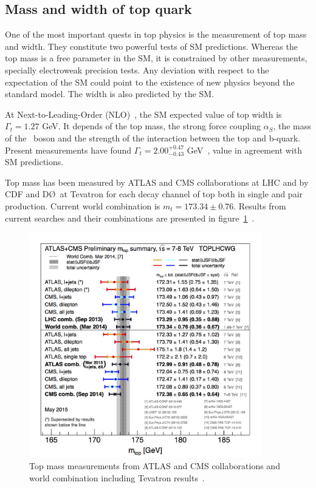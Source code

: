\subsection{Mass and width of top quark}

One of the most important quests in top physics is the measurement of top mass and width. They constitute two powerful tests of SM predictions. Whereas the top mass is a free parameter in the SM, it is constrained by other measurements, specially electroweak precision tests. Any deviation with respect to the expectation of the SM could point to the existence of new physics beyond the standard model. The width is also predicted by the SM.%

At Next-to-Leading-Order (NLO)~\cite{Jezabek19891}, the SM expected value of top width is $\Gamma_{t}=1.27$ GeV. It depends of the top mass, the strong force coupling $\alpha_{S}$, the mass of the \W~boson and the strength of the interaction between the top and b-quark. Present measurements have found $\Gamma_{t}=2.00^{+0.47}_{-0.43}$ GeV~\cite{Abazov:2012vd}, value in agreement with SM predictions. 

Top mass has been measured by ATLAS and CMS collaborations at LHC and by CDF and D\O~at Tevatron for each decay channel of top both in single and pair production. Current world combination is $m_{t}=173.34\pm 0.76$. Results from current searches and their combinations are presented in figure~\ref{fig:TopMass}~\cite{TOPLHCWG}. 

\begin{figure}[!Hhtbp]
  \begin{center}
    \includegraphics[width=0.9\textwidth]{figs/LHC_topmass_May2015.png}
    \caption{Top mass measurements from ATLAS and CMS collaborations and world combination including Tevatron results~\cite{TOPLHCWG}.}
    \label{fig:TopMass}
  \end{center}
\end{figure}

